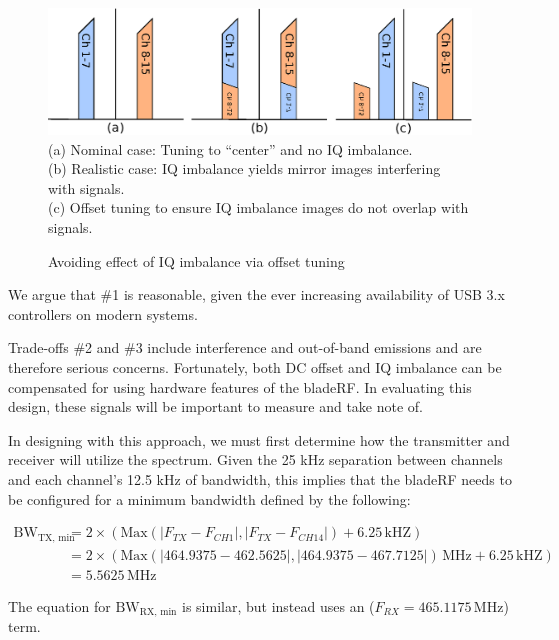 \begin{figure}[h]
  \centering
  \includegraphics[width=6in]{images/frs/iq_imbalance_offset_tuning.eps}
  \\
  \footnotesize{
    (a) Nominal case: Tuning to ``center'' and no IQ imbalance.\\
    (b) Realistic case: IQ imbalance yields mirror images interfering with signals.\\
    (c) Offset tuning to ensure IQ imbalance images do not overlap with signals.
  }
  \caption{Avoiding effect of IQ imbalance via offset tuning}
  \label{fig:iq_imbalance}
\end{figure}

We argue that \#1 is reasonable, given the ever increasing availability of USB 3.x controllers on modern systems.

Trade-offs \#2 and \#3 include interference and out-of-band emissions and are
therefore serious concerns. Fortunately, both DC offset and IQ imbalance can be
compensated for using hardware features of the bladeRF. In evaluating this
design, these signals will be important to measure and take note of.

In designing with this approach, we must first determine how the transmitter and
receiver will utilize the spectrum.  Given the 25 kHz separation between
channels and each channel's 12.5 kHz of bandwidth, this implies that the
bladeRF needs to be configured for a minimum bandwidth defined by the
following:

\begin{align*}
  \text{BW}_{\text{TX, min}} &=
  2 \times \left( \text{Max}\left(|F_{TX} - F_{CH1}|, |F_{TX} - F_{CH14}|\right) + 6.25 \,\text{kHZ} \right) \\
  &= 2 \times \left( \text{Max}\left(|464.9375 - 462.5625|, |464.9375 - 467.7125|\right) \, \text{MHz} + 6.25 \,\text{kHZ} \right) \\
  &= 5.5625 \, \text{MHz}
\end{align*}

The equation for $\text{BW}_{\text{RX, min}}$ is similar, but instead uses an
($F_{RX} = 465.1175 \,\text{MHz}$) term.

